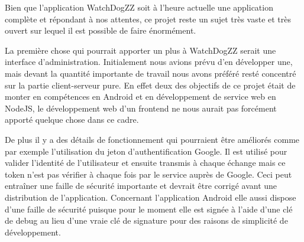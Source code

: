 Bien que l'application WatchDogZZ soit à l'heure actuelle une application complète et répondant à nos attentes, ce projet reste un sujet très vaste et très ouvert sur lequel il est possible de faire énormément.

La première chose qui pourrait apporter un plus à WatchDogZZ serait une interface d’administration. Initialement nous avions prévu d’en développer une, mais devant la quantité importante de travail nous avons préféré resté concentré sur la partie client-serveur pure. En effet deux des objectifs de ce projet était de monter en compétences en Android et en développement de service web en NodeJS, le développement web d’un frontend ne nous aurait pas forcément apporté quelque chose dans ce cadre.

De plus il y a des détails de fonctionnement qui pourraient être améliorés comme par exemple l’utilisation du jeton d’authentification Google. Il est utilisé pour valider l’identité de l’utilisateur et ensuite transmis à chaque échange mais ce token n’est pas vérifier à chaque fois par le service auprès de Google. Ceci peut entraîner une faille de sécurité importante et devrait être corrigé avant une distribution de l’application. Concernant l’application Android elle aussi dispose d’une faille de sécurité puisque pour le moment elle est signée à l’aide d’une clé de debug au lieu d’une vraie clé de signature pour des raisons de simplicité de développement.

